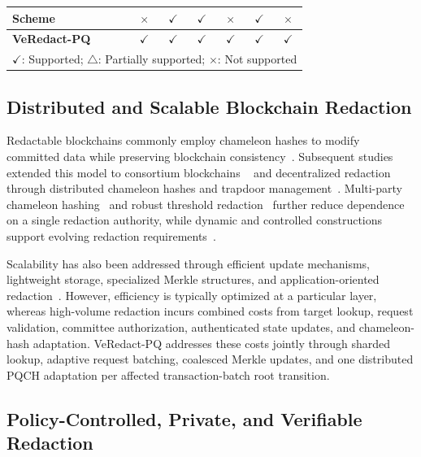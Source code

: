 \documentclass[lettersize,journal]{IEEEtran}
\begin{document}
\begin{table}[t]
\begin{tabular}{lcccccc}
    Scheme~\cite{ref34}
    & $\times$ & $\checkmark$ & $\checkmark$ & $\times$
    & $\checkmark$ & $\times$ \\
    
    \hline
    \textbf{VeRedact-PQ}
    & $\checkmark$ & $\checkmark$ & $\checkmark$
    & $\checkmark$ & $\checkmark$ & $\checkmark$ \\
    \hline
    
    \multicolumn{7}{l}{
    \footnotesize $\checkmark$: Supported;
    $\triangle$: Partially supported;
    $\times$: Not supported}
    \end{tabular}
    \end{table}
    \subsection{Distributed and Scalable Blockchain Redaction}
    
    Redactable blockchains commonly employ chameleon hashes to modify
    committed data while preserving blockchain consistency~\cite{ref9}.
    Subsequent studies extended this model to consortium blockchains
    ~\cite{ref2} and decentralized redaction through distributed chameleon
    hashes and trapdoor management~\textcolor{red}{\cite{ref1,ref3,ref6,ref19}}.
    Multi-party chameleon hashing~\cite{ref12} and robust threshold
    redaction~\cite{ref27} further reduce dependence on a single redaction
    authority, while dynamic and controlled constructions support evolving
    redaction requirements~\cite{ref5,ref16,ref36}.
    
    Scalability has also been addressed through efficient update
    mechanisms, lightweight storage, specialized Merkle structures, and
    application-oriented redaction~\cite{ref14,ref20,ref21,ref23,ref26}.
    However, efficiency is typically optimized at a particular layer,
    whereas high-volume redaction incurs combined costs from target lookup,
    request validation, committee authorization, authenticated state
    updates, and chameleon-hash adaptation. VeRedact-PQ addresses these
    costs jointly through sharded lookup, adaptive request batching,
    coalesced Merkle updates, and one distributed PQCH adaptation per
    affected transaction-batch root transition.
    
    \subsection{Policy-Controlled, Private, and Verifiable Redaction}
    
\end{document}

